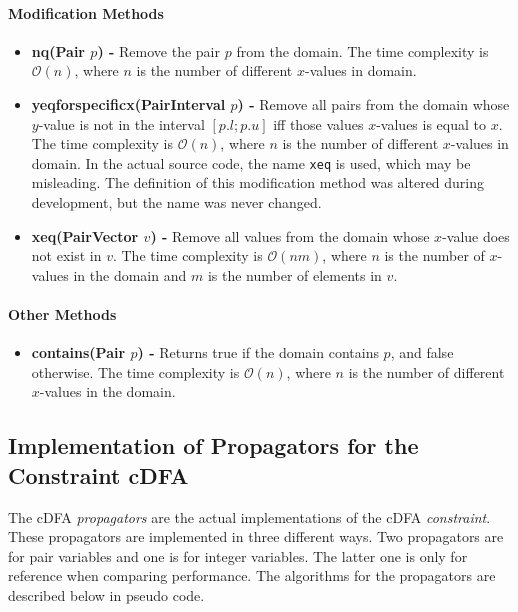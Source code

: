 \documentclass[a4paper,11pt]{article}
\begin{document}
\paragraph{Modification Methods}
\begin{itemize}
\item {\textbf{nq(Pair $p$) - }} Remove the pair $p$ from the domain. The time complexity is $\mathcal{O}(n)$, where $n$ is the number of different $x$-values in domain.

\item{\textbf{yeqforspecificx(PairInterval $p$) - }} Remove all pairs from the domain whose $y$-value is not in the interval $[p.l; p.u]$ iff those values $x$-values is equal to $x$. The time complexity is $\mathcal{O}(n)$, where $n$ is the number of different $x$-values in domain. In the actual source code, the name \texttt{xeq} is used, which may be misleading. The definition of this modification method was altered during development, but the name was never changed.

\item{\textbf{xeq(PairVector $v$) - }} Remove all values from the domain whose $x$-value does not exist in $v$. The time complexity is $\mathcal{O}(nm)$, where $n$ is the number of $x$-values in the domain and $m$ is the number of elements in $v$.
\end{itemize}

\paragraph{Other Methods}
\begin{itemize}
\item {\textbf{contains(Pair $p$) - }} Returns true if the domain contains $p$, and false otherwise. The time complexity is $\mathcal{O}(n)$, where $n$ is the number of different $x$-values in the domain.
\end{itemize}

\subsection{Implementation of Propagators for the Constraint cDFA}
\label{sec:propimp}
The cDFA \textit{propagators} are the actual implementations of the cDFA \textit{constraint}. These propagators are implemented in three different ways. Two propagators are for pair variables and one is for integer variables. The latter one is only for reference when comparing performance. The algorithms for the propagators are described below in pseudo code.
\end{document}
